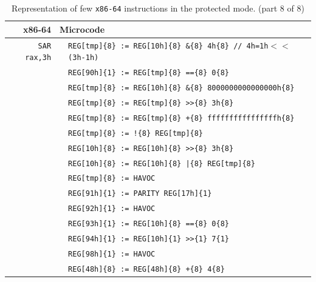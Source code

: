\documentclass[10pt,twocolumn]{article}
\begin{document}
\begin{table}[!h]
\begin{center}
\begin{tabular}{r|rl}
\textbf{x86-64} & \multicolumn{2}{l}{\textbf{Microcode}}
\\ \hline

\texttt{SAR rax,3h} & %
& \texttt{REG[tmp]\{8\} := REG[10h]\{8\} \&\{8\} 4h\{8\} // 4h=1h$ <<  $(3h-1h)} \\ & %
& \texttt{REG[90h]\{1\} := REG[tmp]\{8\} ==\{8\} 0\{8\}} \\  & %
& \texttt{REG[tmp]\{8\} := REG[10h]\{8\}  \&\{8\} 8000000000000000h\{8\}} \\ & %
& \texttt{REG[tmp]\{8\} := REG[tmp]\{8\}  >>\{8\} 3h\{8\}} \\ & %
& \texttt{REG[tmp]\{8\} := REG[tmp]\{8\}  +\{8\} ffffffffffffffffh\{8\}} \\ & %
& \texttt{REG[tmp]\{8\} := !\{8\} REG[tmp]\{8\}} \\ & %
& \texttt{REG[10h]\{8\} := REG[10h]\{8\}  >>\{8\} 3h\{8\}} \\ & %
& \texttt{REG[10h]\{8\} := REG[10h]\{8\}  |\{8\} REG[tmp]\{8\}} \\ & %
& \texttt{REG[tmp]\{8\} := HAVOC} \\ & %
& \texttt{REG[91h]\{1\} := PARITY REG[17h]\{1\}} \\ & %
& \texttt{REG[92h]\{1\} := HAVOC} \\ & %
& \texttt{REG[93h]\{1\} := REG[10h]\{8\} ==\{8\} 0\{8\}} \\ & %
& \texttt{REG[94h]\{1\} := REG[10h]\{1\} >>\{1\} 7\{1\}} \\ & %
& \texttt{REG[98h]\{1\} := HAVOC} \\ & %
& \texttt{REG[48h]\{8\} := REG[48h]\{8\} +\{8\} 4\{8\}} \\ \hline

\end{tabular}
\end{center}
\caption{Representation of few \texttt{x86-64} instructions in the
protected mode. (part 8 of 8)}
\label{tab:recogniser:x86_64_examples:end}
\end{table}
\end{document}
